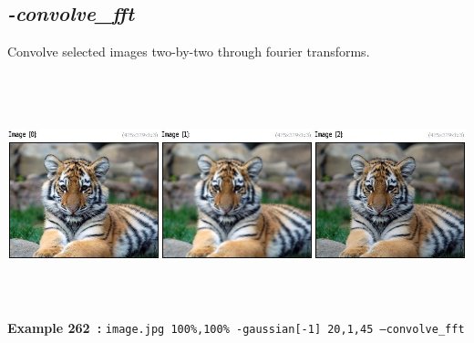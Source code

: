 \documentclass[a4paper,11pt,twoside]{book}
\begin{document}
\subsection{\emph{-convolve\_fft} }\vspace*{-0.5em}
Convolve selected images two-by-two through fourier transforms.
\begin{center}\includegraphics[keepaspectratio=true,height=7cm,width=\textwidth]{img/gmic_def262.jpg}\\
{\footnotesize \textbf{Example 262~:} \texttt{image.jpg 100\%,100\% -gaussian[-1] 20,1,45 --convolve\_fft}}
\end{center}
\end{document}
